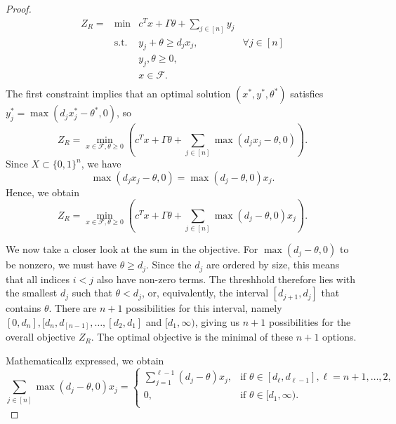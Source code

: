 \begin{proof}
\begin{equation}
\begin{array}{rlll}
 Z_R = &\min&c^Tx+\Gamma\theta+\sum\limits_{j\in [n]}y_j & \\
 					&\text{s.t. } & y_j+\theta\geq d_jx_j, & \forall j\in [n] \\
		&  & y_j,\theta\geq 0, & \\
		&  & x\in \mathcal{F}. &\\
\end{array}
\end{equation}
The first constraint implies that an optimal solution $(x^*,y^*,\theta^*)$ satisfies $y_j^*=\max(d_jx_j^*-\theta^*,0)$, so
\[Z_R = \min\limits_{x\in \mathcal{F},\theta\geq 0}\left( c^Tx+\Gamma\theta+\sum\limits_{j\in [n]}\max(d_jx_j-\theta,0)\right). \]
Since $X\subset \{0,1\}^n$, we have
\[\max(d_jx_j-\theta,0)=\max(d_j-\theta,0)x_j.\]
Hence, we obtain
\[Z_R = \min\limits_{x\in \mathcal{F},\theta\geq 0}\left( c^Tx+\Gamma\theta+\sum\limits_{j\in [n]}\max(d_j-\theta,0)x_j\right). \]

We now take a closer look at the sum in the objective. For $\max(d_j-\theta,0)$ to be nonzero, we must have $\theta \geq d_j$. Since the $d_j$ are ordered by size, this means that all indices $i < j$ also have non-zero terms. The threshhold therefore lies with the smallest $d_j$ such that $\theta < d_j$, or, equivalently, the interval $[d_{j+1},d_j]$ that contains $\theta$. There are $n+1$ possibilities for this interval, namely $[0,d_n],[d_n,d_[n-1],\dots,[d_2,d_1]$ and $[d_1,\infty)$, giving us $n+1$ possibilities for the overall objective $Z_R$. The optimal objective is the minimal of these $n+1$ options.

 Mathematicallz expressed, we obtain
\[\sum\limits_{j\in [n]}\max(d_j-\theta,0)x_j= \begin{cases}
											\sum\limits_{j=1}^{\ell-1}(d_j-\theta)x_j, & \text{if }\theta\in[d_\ell,d_{\ell-1}], \ell=n+1,\dots,2, \\
											0, & \textrm{if }\theta\in[d_1,\infty). \\
											\end{cases}\]


\end{proof}
